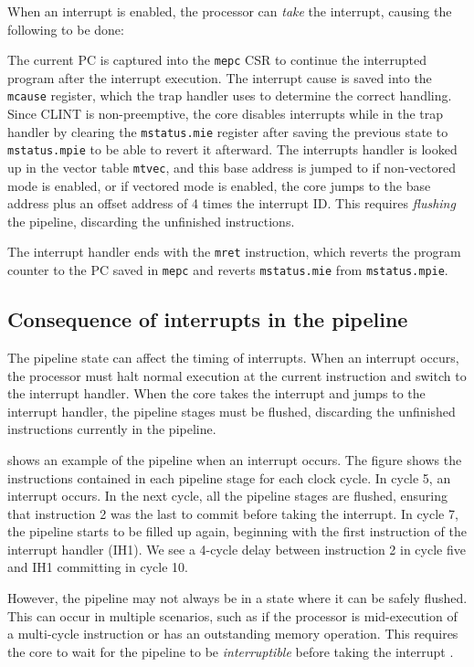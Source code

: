 When an interrupt is enabled, the processor can \textit{take} the interrupt, causing the following to be done:

The current PC is captured into the \lstinline{mepc} CSR to continue the interrupted program after the interrupt execution. 
The interrupt cause is saved into the \lstinline{mcause} register, which the trap handler uses to determine the correct handling.
Since CLINT is non-preemptive, the core disables interrupts while in the trap handler by clearing the \lstinline{mstatus.mie} register after saving the previous state to \lstinline{mstatus.mpie} to be able to revert it afterward. 
The interrupts handler is looked up in the vector table \lstinline{mtvec}, and this base address is jumped to if non-vectored mode is enabled, or if vectored mode is enabled, the core jumps to the base address plus an offset address of 4 times the interrupt ID. This requires \textit{flushing} the pipeline, discarding the unfinished instructions.


The interrupt handler ends with the \lstinline{mret} instruction, which reverts the program counter to the PC saved in \lstinline{mepc} and reverts \lstinline{mstatus.mie} from \lstinline{mstatus.mpie}.

\subsection{Consequence of interrupts in the pipeline}

The pipeline state can affect the timing of interrupts. When an interrupt occurs, the processor must halt normal execution at the current instruction and switch to the interrupt handler. When the core takes the interrupt and jumps to the interrupt handler, the pipeline stages must be flushed, discarding the unfinished instructions currently in the pipeline. 

 shows an example of the pipeline when an interrupt occurs. The figure shows the instructions contained in each pipeline stage for each clock cycle. In cycle 5, an interrupt occurs. In the next cycle, all the pipeline stages are flushed, ensuring that instruction 2 was the last to commit before taking the interrupt. In cycle 7, the pipeline starts to be filled up again, beginning with the first instruction of the interrupt handler (IH1). We see a 4-cycle delay between instruction 2 in cycle five and IH1 committing in cycle 10.

However, the pipeline may not always be in a state where it can be safely flushed. This can occur in multiple scenarios, such as if the processor is mid-execution of a multi-cycle instruction or has an outstanding memory operation. This requires the core to wait for the pipeline to be \textit{interruptible} before taking the interrupt \cite{taylorAdvancedRISCVVerification2023}.



